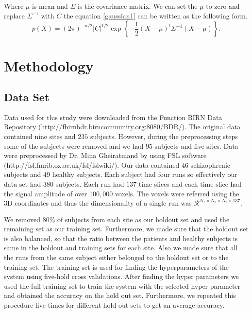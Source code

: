 \documentclass{article} %
\begin{document}
Where $ \mu $   is mean and $ \Sigma $ is the covariance matrix. We can set the $ \mu$ to zero and replace $\Sigma^{-1}$ with $C$ the equation \eqref{gaussian1} can be written as the following form.
\begin{equation}\label{gaussian2}
p(X) = (2\pi)^{-n/2} |C|^{1/2} \exp\left\{ -\frac{1}{2}(X - \mu)^t \Sigma^{-1} (X - \mu) \right\}.
\end{equation}
\section{Methodology}

\subsection{Data Set}
Data used for this study were downloaded from the Function BIRN Data 
Repository (http://fbirnbdr.birncommunity.org:8080/BDR/). The original 
data contained nine sites and $235$ subjects. However, during the 
preprocessing steps some of the subjects were removed and we had $95$ 
subjects and five sites. Data were preprocessed by Dr. Mina Gheiratmand by 
using FSL software (http://fsl.fmrib.ox.ac.uk/fsl/fslwiki/). Our data 
contained $46$ schizophrenic subjects and $49$ healthy subjects. Each subject 
had four runs so effectively our data set had $380$ subjects. Each run had 
$137$ time slices and each time slice had the signal amplitude of over 
$100,000$ voxels. The voxels were referred using the 3D coordinates and thus 
the dimensionality of a single run was 
$\mathcal R^{N_1\times N_2\times N_3 \times 137}$.

We removed $80\%$ of subjects from each site as our holdout set and used the 
remaining set as our training set. Furthermore, we made sure that the holdout 
set is also balanced, so that the ratio between the patients and healthy 
subjects is same in the holdout and training sets for each site. Also we made 
sure that all the runs from the same subject either belonged to the holdout 
set or to the training set. The training set is used for finding the 
hyperparameters of the system using five-hold cross validations. After finding 
the hyper parameters we used the full training set to train the system with 
the selected hyper parameter and obtained the accuracy on the hold out set. 
Furthermore, we repeated this procedure five times for different hold out sets 
to get an average accuracy. 
\end{document}
